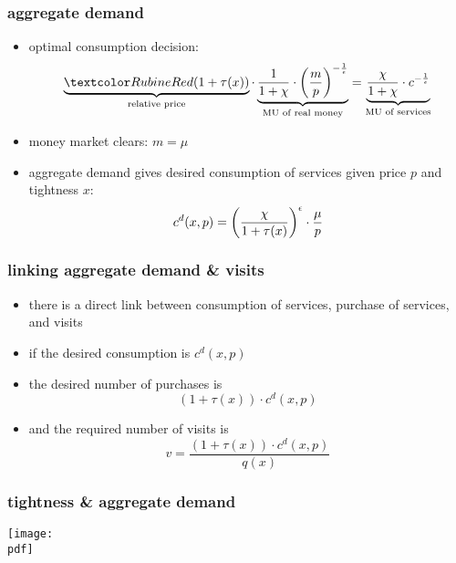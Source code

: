 \documentclass[12pt,xcolor={dvipsnames},hyperref={pdftex,pdfpagemode=UseNone,hidelinks,pdfdisplaydoctitle=true},usepdftitle=false]{beamer}
\def\pdf{xad.pdf}
\begin{document}
\begin{frame}
\frametitle{aggregate demand}
\begin{itemize}
\item optimal consumption decision:
\begin{equation*}
\underbrace{\al{\bp{1+\tau(x)}}}_{\text{relative price}} \cdot \underbrace{\frac{1}{1+\c}\cdot \bp{\frac{m}{p}}^{-\frac{1}{\e}}}_{\text{MU of real money}} =\underbrace{\frac{\c}{1+\c}\cdot c^{-\frac{1}{\e}}}_{\text{MU of services}}
\end{equation*}
\item money market clears: $m=\mu$
\item aggregate demand gives desired consumption of services given price $p$ and tightness $x$:
\begin{equation*}
c^{d}(x,p)=\left( \frac{\chi}{1+\tau(x)} \right)^\epsilon\cdot \frac{\mu}{p}
\end{equation*}
\end{itemize}
\end{frame}

\begin{frame}
\frametitle{linking aggregate demand \& visits}
\begin{itemize}
\item there is a direct link between consumption of services, purchase of services, and visits 
\item if the desired consumption is $c^d(x,p)$
\item the desired number of purchases is 
\begin{equation*}
(1+\tau(x))\cdot c^{d}(x,p)
\end{equation*}
\item  and the required number of visits is 
\begin{equation*}
v = \frac{(1+\tau(x))\cdot c^{d}(x,p)}{q(x)}
\end{equation*}
\end{itemize}
\end{frame}


\begin{frame}
\frametitle{tightness \& aggregate demand}
\texttt{[image: \\pdf]}%
\end{frame}
\end{document}
